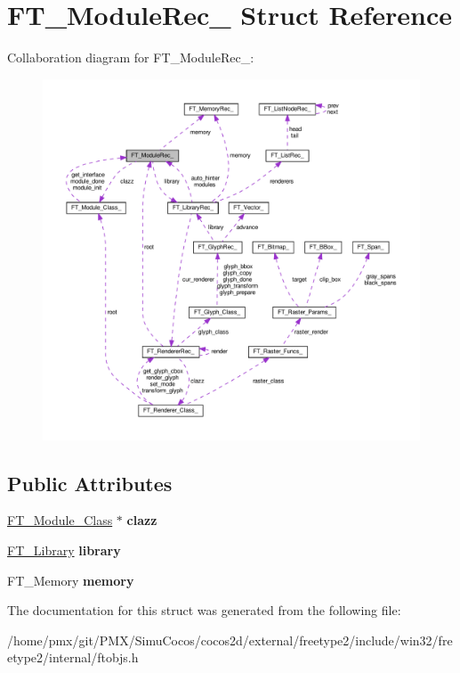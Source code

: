 \hypertarget{structFT__ModuleRec__}{}\section{F\+T\+\_\+\+Module\+Rec\+\_\+ Struct Reference}
\label{structFT__ModuleRec__}


Collaboration diagram for F\+T\+\_\+\+Module\+Rec\+\_\+\+:
\nopagebreak
\begin{figure}[H]
\begin{center}
\leavevmode
\includegraphics[width=350pt]{structFT__ModuleRec____coll__graph}
\end{center}
\end{figure}
\subsection*{Public Attributes}
\begin{DoxyCompactItemize}
\item 
\mbox{\label{structFT__ModuleRec___a9c3cb23d7b10c853239ee6caca80c505}} 
\hyperlink{structFT__Module__Class__}{F\+T\+\_\+\+Module\+\_\+\+Class} $\ast$ {\bfseries clazz}
\item 
\mbox{\label{structFT__ModuleRec___ac3d04fbdc2988bf9a39f4ad6d3cb4b5f}} 
\hyperlink{structFT__LibraryRec__}{F\+T\+\_\+\+Library} {\bfseries library}
\item 
\mbox{\label{structFT__ModuleRec___a33113e9eb2d6cd8ee6666da75ff8e108}} 
F\+T\+\_\+\+Memory {\bfseries memory}
\end{DoxyCompactItemize}


The documentation for this struct was generated from the following file\+:\begin{DoxyCompactItemize}
\item 
/home/pmx/git/\+P\+M\+X/\+Simu\+Cocos/cocos2d/external/freetype2/include/win32/freetype2/internal/ftobjs.\+h\end{DoxyCompactItemize}

